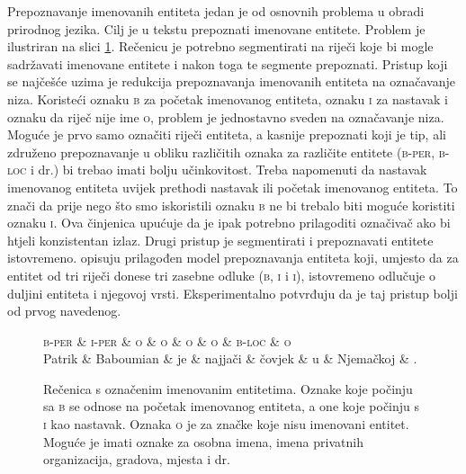 Prepoznavanje imenovanih entiteta  jedan je od
osnovnih problema u obradi prirodnog jezika. Cilj je u tekstu prepoznati
imenovane entitete. Problem je ilustriran na slici
\ref{fig:namedentityrecognition}. Rečenicu je potrebno segmentirati na riječi
koje bi mogle sadržavati imenovane entitete i nakon toga te segmente prepoznati.
Pristup koji se najčešće uzima je redukcija prepoznavanja imenovanih entiteta na
označavanje niza. Koristeći oznaku \textsc{b} za početak imenovanog entiteta,
oznaku \textsc{i} za nastavak i oznaku da riječ nije ime \textsc{o}, problem je
jednostavno sveden na označavanje niza. Moguće je prvo samo označiti riječi
entiteta, a kasnije prepoznati koji je tip, ali združeno prepoznavanje u obliku
različitih oznaka za različite entitete (\textsc{b-per}, \textsc{b-loc} i dr.)
bi trebao imati bolju učinkovitost. Treba napomenuti da nastavak imenovanog
entiteta uvijek prethodi nastavak ili početak imenovanog entiteta. To znači da
prije nego što smo iskoristili oznaku \textsc{b} ne bi trebalo biti moguće
koristiti oznaku \textsc{i}. Ova činjenica upućuje da je ipak potrebno
prilagoditi označivač ako bi htjeli konzistentan izlaz. Drugi pristup je
segmentirati i prepoznavati entitete istovremeno. \citet{sarawagi2004semi}
opisuju prilagođen model prepoznavanja entiteta koji, umjesto da za entitet od
tri riječi donese tri zasebne odluke (\textsc{b}, \textsc{i} i \textsc{i}),
istovremeno odlučuje o duljini entiteta i njegovoj vrsti. Eksperimentalno
potvrđuju da je taj pristup bolji od prvog navedenog.

\begin{figure}[H]
\centering
\begin{dependency}
\begin{deptext}
  \textsc{b-per} \& \textsc{i-per} \& \textsc{o} \& \textsc{o} \& \textsc{o} \& \textsc{o} \& \textsc{b-loc} \& \textsc{o} \\
  Patrik         \& Baboumian      \& je         \& najjači    \& čovjek     \& u          \& Njemačkoj      \& .          \\
\end{deptext}
\end{dependency}
\caption[Rečenica s označenim imenovanim entitetima.]{Rečenica s označenim
imenovanim entitetima. Oznake koje počinju sa \textsc{b} se odnose na početak
imenovanog entiteta, a one koje počinju s \textsc{i} kao nastavak. Oznaka
\textsc{o} je za značke koje nisu imenovani entitet. Moguće je imati oznake za
osobna imena, imena privatnih organizacija, gradova, mjesta i dr.}
\label{fig:namedentityrecognition}
\end{figure}

